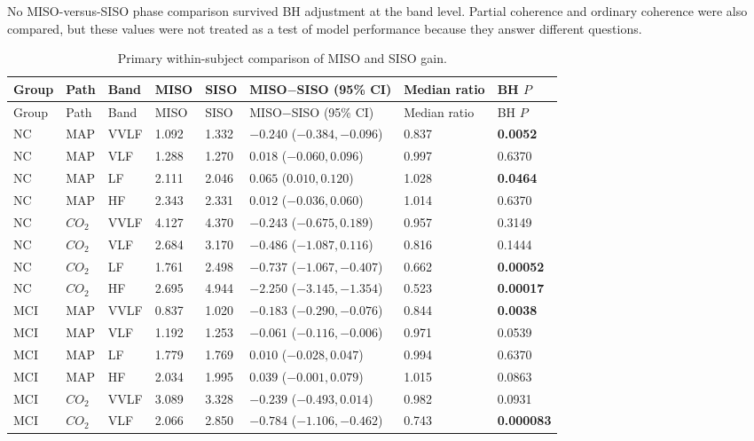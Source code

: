 \documentclass[12pt]{article}
\newcommand{\COtwo}{CO_2}
\begin{document}
No MISO-versus-SISO phase comparison survived BH adjustment at the band level.
Partial coherence and ordinary coherence were also compared, but these values
were not treated as a test of model performance because they answer different
questions.

\begin{landscape}
\scriptsize
\begin{longtable}{p{0.48in}p{0.48in}p{0.48in}p{0.62in}p{0.62in}p{1.18in}p{0.62in}p{0.62in}}
\caption{Primary within-subject comparison of MISO and SISO gain.}
\label{tab:model_gain}\\
\toprule
Group & Path & Band & MISO & SISO & MISO$-$SISO (95\% CI) & Median ratio & BH $P$ \\
\midrule
\endfirsthead
\toprule
Group & Path & Band & MISO & SISO & MISO$-$SISO (95\% CI) & Median ratio & BH $P$ \\
\midrule
\endhead
NC & MAP & VVLF & 1.092 & 1.332 & $-0.240$ ($-0.384,-0.096$) & 0.837 & \textbf{0.0052} \\
NC & MAP & VLF  & 1.288 & 1.270 & $0.018$ ($-0.060,0.096$) & 0.997 & 0.6370 \\
NC & MAP & LF   & 2.111 & 2.046 & $0.065$ ($0.010,0.120$) & 1.028 & \textbf{0.0464} \\
NC & MAP & HF   & 2.343 & 2.331 & $0.012$ ($-0.036,0.060$) & 1.014 & 0.6370 \\
NC & $\COtwo$ & VVLF & 4.127 & 4.370 & $-0.243$ ($-0.675,0.189$) & 0.957 & 0.3149 \\
NC & $\COtwo$ & VLF  & 2.684 & 3.170 & $-0.486$ ($-1.087,0.116$) & 0.816 & 0.1444 \\
NC & $\COtwo$ & LF   & 1.761 & 2.498 & $-0.737$ ($-1.067,-0.407$) & 0.662 & \textbf{0.00052} \\
NC & $\COtwo$ & HF   & 2.695 & 4.944 & $-2.250$ ($-3.145,-1.354$) & 0.523 & \textbf{0.00017} \\
\addlinespace
MCI & MAP & VVLF & 0.837 & 1.020 & $-0.183$ ($-0.290,-0.076$) & 0.844 & \textbf{0.0038} \\
MCI & MAP & VLF  & 1.192 & 1.253 & $-0.061$ ($-0.116,-0.006$) & 0.971 & 0.0539 \\
MCI & MAP & LF   & 1.779 & 1.769 & $0.010$ ($-0.028,0.047$) & 0.994 & 0.6370 \\
MCI & MAP & HF   & 2.034 & 1.995 & $0.039$ ($-0.001,0.079$) & 1.015 & 0.0863 \\
MCI & $\COtwo$ & VVLF & 3.089 & 3.328 & $-0.239$ ($-0.493,0.014$) & 0.982 & 0.0931 \\
MCI & $\COtwo$ & VLF  & 2.066 & 2.850 & $-0.784$ ($-1.106,-0.462$) & 0.743 & \textbf{0.000083} \\

\end{longtable}
\end{landscape}
\end{document}
